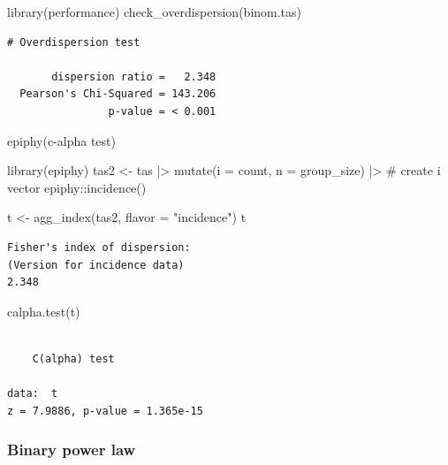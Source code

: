 \documentclass[
  letterpaper,
]{book}
\newenvironment{Shaded}{\begin{snugshade}}{\end{snugshade}}
\newcommand{\AttributeTok}[1]{\textcolor[rgb]{0.40,0.45,0.13}{#1}}
\newcommand{\CommentTok}[1]{\textcolor[rgb]{0.37,0.37,0.37}{#1}}
\newcommand{\FunctionTok}[1]{\textcolor[rgb]{0.28,0.35,0.67}{#1}}
\newcommand{\NormalTok}[1]{\textcolor[rgb]{0.00,0.23,0.31}{#1}}
\newcommand{\OtherTok}[1]{\textcolor[rgb]{0.00,0.23,0.31}{#1}}
\newcommand{\SpecialCharTok}[1]{\textcolor[rgb]{0.37,0.37,0.37}{#1}}
\newcommand{\StringTok}[1]{\textcolor[rgb]{0.13,0.47,0.30}{#1}}
\begin{document}
\begin{Shaded}
\begin{Highlighting}[]
\FunctionTok{library}\NormalTok{(performance)}
\FunctionTok{check\_overdispersion}\NormalTok{(binom.tas)}
\end{Highlighting}
\end{Shaded}

\begin{verbatim}
# Overdispersion test

       dispersion ratio =   2.348
  Pearson's Chi-Squared = 143.206
                p-value = < 0.001
\end{verbatim}

epiphy(c-alpha test)

\begin{Shaded}
\begin{Highlighting}[]
\FunctionTok{library}\NormalTok{(epiphy)}
\NormalTok{tas2 }\OtherTok{\textless{}{-}}\NormalTok{ tas }\SpecialCharTok{|\textgreater{}}
  \FunctionTok{mutate}\NormalTok{(}\AttributeTok{i =}\NormalTok{ count,}
         \AttributeTok{n =}\NormalTok{ group\_size) }\SpecialCharTok{|\textgreater{}}  \CommentTok{\# create i vector}
\NormalTok{  epiphy}\SpecialCharTok{::}\FunctionTok{incidence}\NormalTok{()}

\NormalTok{t }\OtherTok{\textless{}{-}} \FunctionTok{agg\_index}\NormalTok{(tas2, }\AttributeTok{flavor =} \StringTok{"incidence"}\NormalTok{)}
\NormalTok{t}
\end{Highlighting}
\end{Shaded}

\begin{verbatim}
Fisher's index of dispersion:
(Version for incidence data)
2.348
\end{verbatim}

\begin{Shaded}
\begin{Highlighting}[]
\FunctionTok{calpha.test}\NormalTok{(t)}
\end{Highlighting}
\end{Shaded}

\begin{verbatim}

    C(alpha) test

data:  t
z = 7.9886, p-value = 1.365e-15
\end{verbatim}

\hypertarget{binary-power-law}{%
\subsubsection{Binary power law}\label{binary-power-law}}
\end{document}
